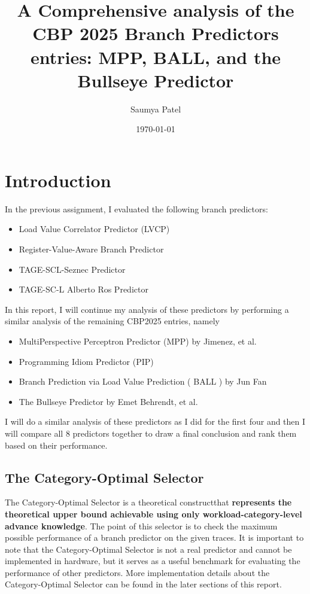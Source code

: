 \documentclass[11pt,a4paper]{article}
\title{\textbf{A Comprehensive analysis of the CBP 2025 Branch Predictors entries: MPP, BALL, and the Bullseye Predictor}}
\author{Saumya Patel}
\date{\today}
\begin{document}
\maketitle
\thispagestyle{empty}
\tableofcontents
\newpage

\setcounter{page}{1}

\section{Introduction}
In the previous assignment, I evaluated the following branch predictors:
\begin{itemize}
\item Load Value Correlator Predictor (LVCP)
\item Register-Value-Aware Branch Predictor
\item TAGE-SCL-Seznec Predictor
\item TAGE-SC-L Alberto Ros Predictor
\end{itemize}
In this report, I will continue my analysis of these predictors by performing a similar analysis of the remaining CBP2025 entries, namely
\begin{itemize}
        \item MultiPerspective Perceptron Predictor (MPP) by Jimenez, et al.
        \item Programming Idiom Predictor (PIP)
        \item Branch Prediction via Load Value Prediction ( BALL ) by Jun Fan
        \item The Bullseye Predictor by Emet Behrendt, et al.
\end{itemize}
I will do a similar analysis of these predictors as I did for the first four and then I will compare all 8 predictors together to draw a final conclusion
and rank them based on their performance. 

\subsection{The Category-Optimal Selector}
The Category-Optimal Selector is a theoretical constructthat \textbf{represents the theoretical upper bound achievable using only workload-category-level advance knowledge}. The point of this selector is
to check the maximum possible performance of a branch predictor on the given traces. It is important to note that the Category-Optimal Selector is not a real predictor
and cannot be implemented in hardware, but it serves as a useful benchmark for evaluating the performance of other predictors.
More implementation details about the Category-Optimal Selector can be found in the later sections of this report. 
\end{document}
